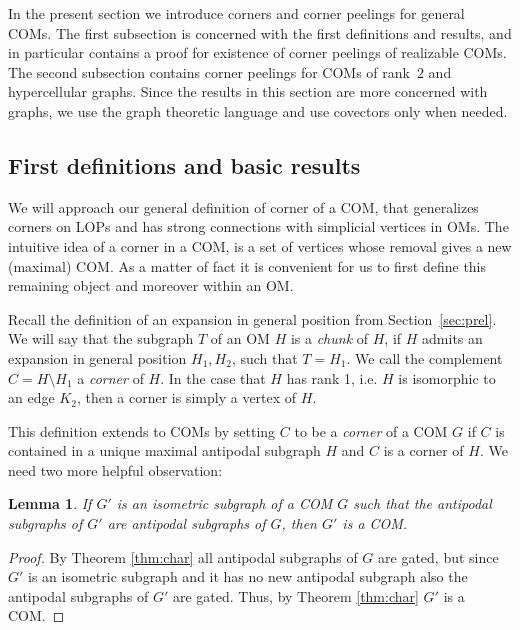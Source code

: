 \documentclass[final,11pt]{article}
\newtheorem{lem}[thm]{Lemma}%
\begin{document}


In the present section we introduce corners and corner peelings for general COMs. The first subsection is concerned with the first definitions and results, and in particular contains a proof for existence of corner peelings of realizable COMs. The second subsection contains corner peelings for COMs of rank~$2$ and hypercellular graphs. Since the results in this section are more concerned with graphs, we use the graph theoretic language and use covectors only when needed.

\subsection{First definitions and basic results}
We will approach our general definition of corner of a COM, that generalizes corners on LOPs and has strong connections with simplicial vertices in OMs.
The intuitive idea of a corner in a COM, is a set of vertices whose removal gives a new (maximal) COM. As a matter of fact it is convenient for us to first define this remaining object and moreover within an OM.

Recall the definition of an expansion in general position from Section~\ref{sec:prel}.
We will say that the subgraph $T$ of an OM $H$ is a \emph{chunk} of $H$, if $H$ admits an expansion in general position $H_1, H_2$, such that $T=H_1$. We call the complement $C=H\setminus H_1$ a \emph{corner} of $H$. In the case that $H$ has rank 1, i.e. $H$ is isomorphic to an edge $K_2$, then a corner is simply a vertex of $H$.


This definition extends to COMs by setting $C$ to be a \emph{corner} of a COM $G$ if $C$ is contained in a unique maximal antipodal subgraph $H$ and $C$ is a corner of $H$. 
We need two more helpful observation:

\begin{lem}\label{lem:isometric}
 If $G'$ is an isometric subgraph of a COM $G$ such that the antipodal subgraphs of $G'$ are antipodal subgraphs of $G$, then $G'$ is a COM. 
\end{lem}
\begin{proof}
 By Theorem \ref{thm:char} all antipodal subgraphs of $G$ are gated, but since $G'$ is an isometric subgraph and it has no new antipodal subgraph also the antipodal subgraphs of $G'$ are gated. Thus, by Theorem \ref{thm:char} $G'$  is a COM.  
\end{proof}
\end{document}

